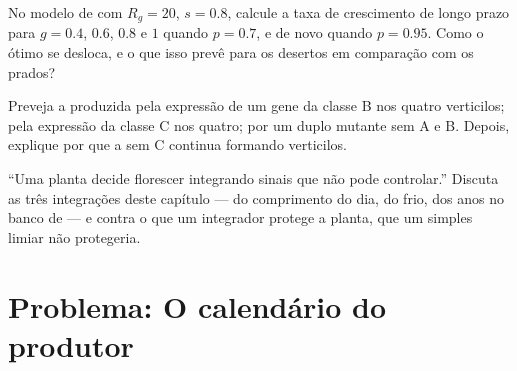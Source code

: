 \begin{exercise}[$\star\star\star$]\label{exo:b2:plant-flowering:10}
No modelo de  com $R_g = 20$, $s = 0.8$, calcule
a taxa de crescimento de longo prazo para $g = 0.4$, $0.6$, $0.8$ e $1$
quando $p = 0.7$, e de novo quando $p = 0.95$. Como o ótimo se desloca,
e o que isso prevê para os desertos em comparação com os prados?
\end{exercise}

\begin{exercise}[$\star\star\star$]\label{exo:b2:plant-flowering:11}
Preveja a  produzida pela expressão de um gene da classe B nos
quatro verticilos; pela expressão da classe C nos quatro; por um duplo
mutante sem A e B. Depois, explique por que a  sem C continua
formando verticilos.
\end{exercise}

\begin{exercise}[$\star\star\star$]\label{exo:b2:plant-flowering:12}
``Uma planta decide florescer integrando sinais que não pode
controlar.'' Discuta as três integrações deste capítulo --- do
comprimento do dia, do frio, dos anos no banco de  --- e contra
o que um integrador protege a planta, que um simples limiar não
protegeria.
\end{exercise}

\section{Problema: O calendário do produtor}

